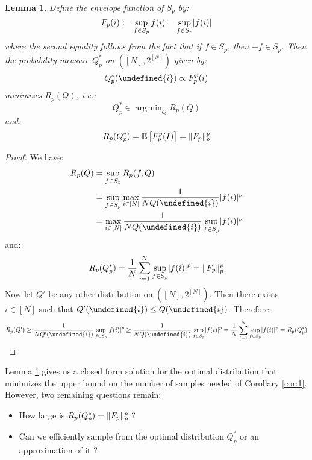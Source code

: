 \documentclass{article}
\theoremstyle{plain}
\newtheorem{lemma}{Lemma}
\theoremstyle{definition}
\theoremstyle{remark}
\newcommand{\defeq}{\vcentcolon=}
\let\brace\undefined
\DeclarePairedDelimiter{\brace}{\lbrace}{\rbrace}
\DeclareMathOperator*{\argmin}{\arg\!\min}
\DeclarePairedDelimiter{\abs}{\lvert}{\rvert}
\DeclarePairedDelimiter{\norm}{\lVert}{\rVert}
\newcommand{\E}[1]{\mathbb{E}\left[#1\right]}
\begin{document}
\begin{lemma}
    \label{lem:1}
    Define the envelope function of $S_p$ by:
    \begin{equation*}
    F_p(i) \defeq \sup_{f \in S_p} f(i) = \sup_{f \in S_p} \abs{f(i)}
    \end{equation*}
    where the second equality follows from the fact that if $f \in S_p$, then $-f \in S_p$. Then the probability measure $Q_p^{*}$ on $([N], 2^{[N]})$ given by:
    \begin{equation*}
        Q_p^{*}(\brace{i}) \propto F_p^p(i)
    \end{equation*}
    minimizes $R_p(Q)$, i.e.:
    \begin{equation*}
        Q_p^{*} \in \argmin_{Q} R_p(Q)
    \end{equation*}
    and:
    \begin{equation*}
        R_p(Q_p^{*}) = \E{F_p^p(I)} = \norm{F_p}_p^p
    \end{equation*}
\end{lemma}

\begin{proof}
    We have:
    \begin{align*}
        R_p(Q) &= \sup_{f \in S_p} R_p(f, Q) \\
        &= \sup_{f \in S_p} \max_{i \in [N]} \frac{1}{N Q(\brace{i})} \abs{f(i)}^p \\
        &= \max_{i \in [N]} \frac{1}{NQ(\brace{i})} \sup_{f \in S_p} \abs{f(i)}^p
    \end{align*}
    and:
    \begin{equation*}
        R_p(Q_p^{*}) = \frac{1}{N} \sum_{i=1}^{N} \sup_{f \in S_p} \abs{f(i)}^{p} = \norm{F_p}_p^p
    \end{equation*}
    Now let $Q'$ be any other distribution on $([N], 2^{[N]})$. Then there exists $i \in [N]$ such that $Q'(\brace{i}) \leq Q(\brace{i})$. Therefore:
    \begin{equation*}
        R_p(Q') \geq \frac{1}{NQ'(\brace{i})} \sup_{f \in S_p} \abs{f(i)}^p \geq \frac{1}{NQ(\brace{i})} \sup_{f \in S_p} \abs{f(i)}^p = \frac{1}{N} \sum_{i=1}^{N}\sup_{f \in S_p} \abs{f(i)}^{p} = R_p(Q_p^{*})
    \end{equation*}
\end{proof}

Lemma \ref{lem:1} gives us a closed form solution for the optimal distribution that minimizes the upper bound on the number of samples needed of Corollary \ref{cor:1}. However, two remaining questions remain:
\begin{itemize}
    \item How large is $R_p(Q_p^{*}) = \norm{F_p}_p^p$ ?
    \item Can we efficiently sample from the optimal distribution $Q_p^{*}$ or an approximation of it ?
\end{itemize}
\end{document}
